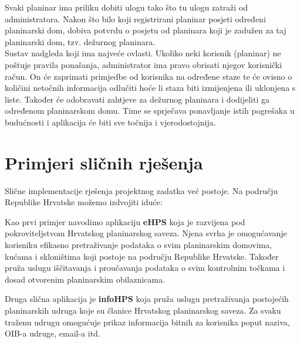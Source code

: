 		Svaki planinar ima priliku dobiti ulogu  tako što tu ulogu zatraži od administratora. Nakon što bilo koji registrirani planinar posjeti određeni planinarski dom, dobiva potvrdu o posjetu od planinara koji je zadužen za taj planinarski dom, tzv. dežurnog planinara.\\
		
		Sustav nadgleda  koji ima najveće ovlasti. Ukoliko neki korisnik (planinar) ne poštuje pravila ponašanja, administrator ima pravo obrisati njegov korisnički račun. On će zaprimati primjedbe od korisnika na određene staze te će ovisno o količini netočnih informacija odlučiti hoće li staza biti izmijenjena ili uklonjena s liste. Također će odobravati zahtjeve za dežurnog planinara i dodijeliti ga određenom planinarskom domu. Time se sprječava ponavljanje istih pogrešaka u budućnosti i aplikacija će biti sve točnija i vjerodostojnija. 
		
		
		\section{Primjeri sličnih rješenja}
		Slične implementacije rješenja projektnog zadatka već postoje. Na području Republike Hrvatske možemo izdvojiti iduće: 
		\begin{packed_enum}
			\item Kao prvi primjer navodimo aplikaciju \textbf{eHPS} koja je razvijena pod pokroviteljstvom Hrvatskog planinarskog saveza. Njena svrha je omogućavanje korisniku efikasno pretraživanje podataka o svim planinarskim domovima, kućama i skloništima koji postoje na području Republike Hrvatske. Također pruža uslugu iščitavanja i proučavanja podataka o svim kontrolnim točkama i dosad otvorenim planinarskim obilaznicama.
			\item Druga slična aplikacija je \textbf{infoHPS} koja pruža uslugu pretraživanja postojećih planinarskih udruga koje su članice Hrvatskog planinarskog saveza. Za svaku traženu udrugu omogućuje prikaz informacija bitnih za korisnika poput naziva, OIB-a udruge, email-a itd. 
		\end{packed_enum}
	
